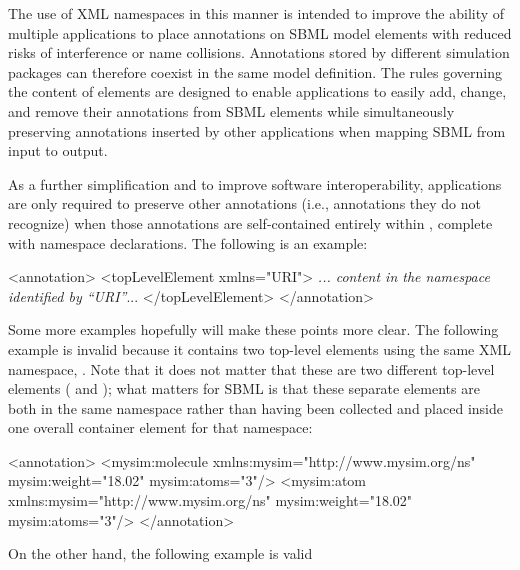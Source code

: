 The use of XML namespaces in this manner is intended to improve
the ability of multiple applications to place annotations on SBML
model elements with reduced risks of interference or name
collisions.  Annotations stored by different simulation packages
can therefore coexist in the same model definition.  The rules
governing the content of  elements are designed
to enable applications to easily add, change, and remove their
annotations from SBML elements while simultaneously preserving
annotations inserted by other applications when mapping SBML from
input to output.

As a further simplification and to improve software
interoperability, applications are only required to preserve other
annotations (i.e., annotations they do not recognize) when those
annotations are self-contained entirely within ,
complete with namespace declarations.  The following is an
example:

\begin{example}
<annotation>
    <topLevelElement xmlns="URI">
       \textrm{\emph{... content in the namespace identified by \textquotedblleft{}URI\textquotedblright}...}
    </topLevelElement>
</annotation>
\end{example}

Some more examples hopefully will make these points more clear.
The following example is invalid because it contains two top-level
elements using the same XML namespace,  .  Note that it does not
matter that these are two different top-level elements
( and ); what matters for
SBML is that these separate elements are both in the same
namespace rather than having been collected and placed inside one
overall container element for that namespace:

\begin{example}
<annotation>
   <mysim:molecule xmlns:mysim="http://www.mysim.org/ns" mysim:weight="18.02" mysim:atoms="3"/>
   <mysim:atom xmlns:mysim="http://www.mysim.org/ns" mysim:weight="18.02" mysim:atoms="3"/>
</annotation>
\end{example}

On the other hand, the following example is valid

